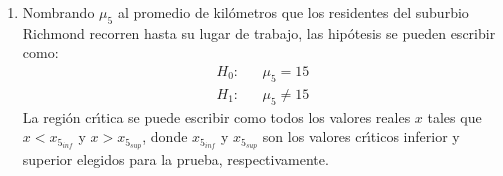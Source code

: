 \begin{solucion}
\begin{enumerate}
  \item Nombrando $\mu_5$ al promedio de kil\'ometros que los residentes
  del suburbio Richmond recorren hasta su lugar de trabajo,
  las hip\'otesis se pueden escribir como:
  \begin{eqnarray*}
   H_0: & & \mu_5   =  15 \\
   H_1: & & \mu_5 \neq 15
  \end{eqnarray*}
  La regi\'on cr\'{\i}tica se puede escribir como todos los valores reales
  $x$ tales que $x < x_{5_{inf}}$ y $x > x_{5_{sup}}$,
  donde $x_{5_{inf}}$ y $x_{5_{sup}}$ son los valores cr\'{\i}ticos
  inferior y superior elegidos para la prueba, respectivamente.
 \end{enumerate}
\end{solucion}
